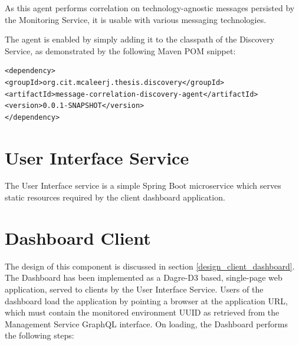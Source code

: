 As this agent performs correlation on technology-agnostic messages persisted by the Monitoring Service, it is usable with various messaging technologies.

The agent is enabled by simply adding it to the classpath of the Discovery Service, as demonstrated by the following Maven POM snippet:

 \vspace{5mm}
 
\begin{lstlisting}
<dependency>
<groupId>org.cit.mcaleerj.thesis.discovery</groupId>
<artifactId>message-correlation-discovery-agent</artifactId>
<version>0.0.1-SNAPSHOT</version>
</dependency>
\end{lstlisting}

 \newpage
 
 \section{User Interface Service}
 
 The User Interface service is a simple Spring Boot microservice which serves static resources required by the client dashboard application.  
 
 \section{Dashboard Client}
 
 The design of this component is discussed in section \ref{design_client_dashboard}. The Dashboard has been implemented as a Dagre-D3 based, single-page web application, served to clients by the User Interface Service. Users of the dashboard load the application by pointing a browser at the application URL, which must contain the monitored environment UUID as retrieved from the Management Service GraphQL interface. On loading, the Dashboard performs the following steps:
 

